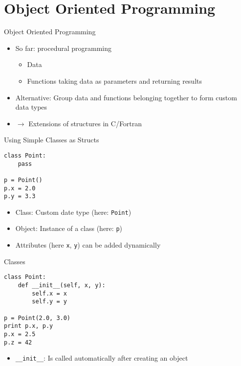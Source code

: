 \section{Object Oriented Programming}

\begin{frame}{Object Oriented Programming}
\begin{itemize}
\item So far: \alert{procedural programming}
\begin{itemize}
\item Data
\item Functions taking data as parameters and returning results
\end{itemize}
\item Alternative: Group data and functions belonging together to form \alert{custom data types}
\item $\rightarrow$ Extensions of structures in C/Fortran
\end{itemize}
\end{frame}

\begin{frame}[fragile]{Using Simple Classes as Structs}
\begin{lstlisting}[style=Python]
class Point:
    pass

p = Point()
p.x = 2.0
p.y = 3.3
\end{lstlisting}
\begin{itemize}
\item \alert{Class}: Custom date type (here: \texttt{Point})
\item \alert{Object}: Instance of a class (here: \texttt{p})
\item Attributes (here \texttt{x}, \texttt{y}) can be added dynamically
\end{itemize}
\end{frame}

\begin{frame}[fragile]{Classes}
\begin{lstlisting}[style=Python]
class Point:
    def __init__(self, x, y):
        self.x = x
        self.y = y

p = Point(2.0, 3.0)
print p.x, p.y
p.x = 2.5
p.z = 42
\end{lstlisting}
\begin{itemize}
\item \texttt{\_\_init\_\_}: Is called automatically after creating an object
\end{itemize}
\end{frame}

